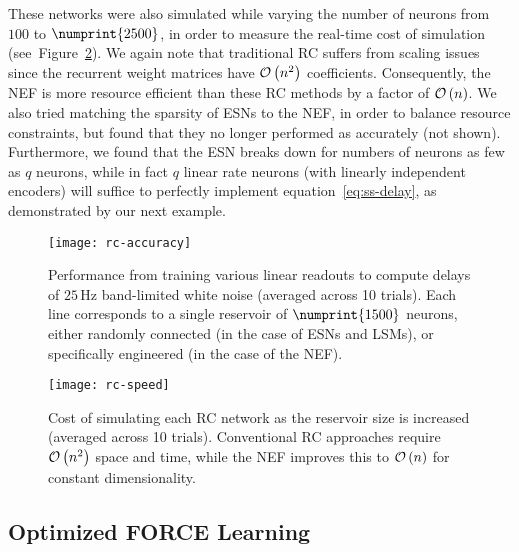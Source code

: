 These networks were also simulated while varying the number of neurons from $100$ to $\numprint{2500}$, in order to measure the real-time cost of simulation (see~Figure~\ref{fig:rc-speed}).
We again note that traditional RC suffers from scaling issues since the recurrent weight matrices have $\mathcal{O}\left({ n^2 }\right)$ coefficients.
Consequently, the NEF is more resource efficient than these RC methods by a factor of $\mathcal{O}\left({ n }\right)$.
We also tried matching the sparsity of ESNs to the NEF, in order to balance resource constraints, but found that they no longer performed as accurately (not shown).
Furthermore, we found that the ESN breaks down for numbers of neurons as few as $q$ neurons, while in fact $q$ linear rate neurons (with linearly independent encoders) will suffice to perfectly implement equation~\ref{eq:ss-delay}, as demonstrated by our next example.

\begin{figure}[h]
  \centering
  \texttt{[image: rc-accuracy]}
  \caption{ \label{fig:rc-accuracy}
  Performance from training various linear readouts to compute delays of $25$\,Hz band-limited white noise (averaged across 10 trials).
  Each line corresponds to a single reservoir of $\numprint{1500}$ neurons, either randomly connected (in the case of ESNs and LSMs), or specifically engineered (in the case of the NEF).
  }
\end{figure}

\begin{figure}
  \centering
  \texttt{[image: rc-speed]}
  \caption{ \label{fig:rc-speed}
  Cost of simulating each RC network as the reservoir size is increased (averaged across 10 trials).
  Conventional RC approaches require $\mathcal{O}\left({ n^2 }\right)$ space and time, while the NEF improves this to $\mathcal{O}\left({ n }\right)$ for constant dimensionality.
  }
\end{figure}


\subsection{Optimized FORCE Learning}
\label{sec:force-comparison}


